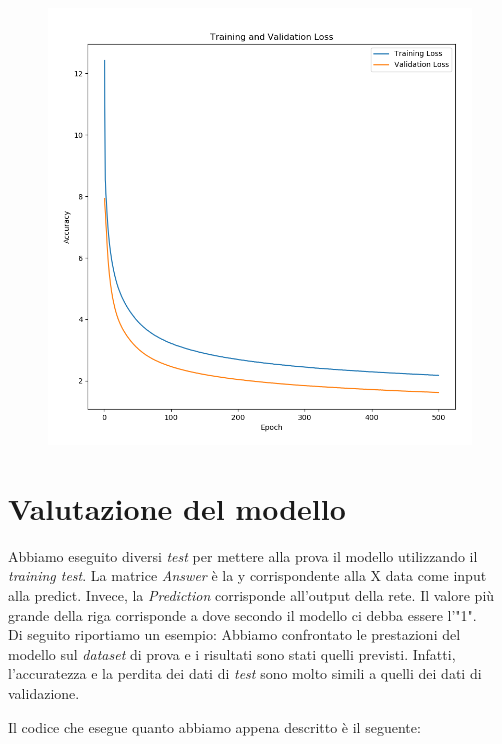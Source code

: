 \begin{figure}[H]
	\centering
	\includegraphics[scale=0.50]{./images/plot2.png}
\end{figure}

\section{Valutazione del modello}
Abbiamo eseguito diversi \textit{test} per mettere alla prova il modello utilizzando il \textit{training test}. La matrice \textit{Answer} è la y corrispondente alla X data come input alla predict. Invece, la \textit{Prediction} corrisponde all'output della rete. Il valore più grande della riga corrisponde a dove secondo il modello ci debba essere l'"1".\\
\newline
Di seguito riportiamo un esempio:
\vspace*{2ex}
\vspace*{2ex}
Abbiamo confrontato le prestazioni del modello sul \textit{dataset} di prova e i risultati sono stati quelli previsti. Infatti, l'accuratezza e la perdita dei dati di \textit{test} sono molto simili a quelli dei dati di validazione.
\vspace*{2ex}
\vspace*{2ex}

Il codice che esegue quanto abbiamo appena descritto è il seguente:
\vspace*{2ex}
\vspace*{2ex}